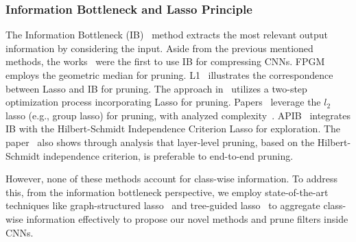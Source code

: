 \subsubsection{Information Bottleneck and Lasso Principle}

The Information Bottleneck (IB)~\cite{Tishby2000TheIB} method extracts the most relevant output information by considering the input. Aside from the previous mentioned methods, the works~\cite{Tishby2015DeepLA,Dai2018CompressingNN} were the first to use IB for compressing CNNs. FPGM~\cite{He2018FilterPV} employs the geometric median for pruning. L1~\cite{Li2016PruningFF} illustrates the correspondence between Lasso and IB for pruning. The approach in~\cite{He2017ChannelPF} utilizes a two-step optimization process incorporating Lasso for pruning. Papers~\cite{Scardapane2016GroupSR,Scardapane2016GroupSR} leverage the $l_2$ lasso (e.g., group lasso) for pruning, with analyzed complexity~\cite{Rajaraman2023GreedyPW}. APIB~\cite{guo2023automatic} integrates IB with the Hilbert-Schmidt Independence Criterion Lasso for exploration. The paper~\cite{Sakamoto2024EndtoEndTI} also shows through analysis that layer-level pruning, based on the Hilbert-Schmidt independence criterion, is preferable to end-to-end pruning.

However, none of these methods account for class-wise information. To address this, from the information bottleneck perspective, we employ state-of-the-art techniques like graph-structured lasso~\cite{Liu2024NovelTG} and tree-guided lasso~\cite{Liu2024SparseVS} to aggregate class-wise information effectively to propose our novel methods and prune filters inside CNNs.
